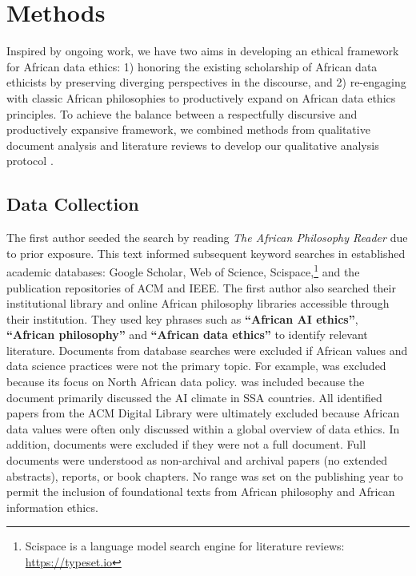 \section{Methods}
\label{sec:methods}
Inspired by ongoing work,
we have two aims in
developing an ethical framework for African data ethics: 1) honoring the existing scholarship of African data ethicists by preserving diverging perspectives in the discourse, and 2) re-engaging with classic African philosophies to productively expand on African data ethics principles. To achieve the balance between a respectfully discursive and productively expansive framework, we combined methods from qualitative document analysis and literature reviews to develop our qualitative analysis protocol
\cite{morgan2022conducting, birhane2022forgotten, battle2024what}. 

\subsection{Data Collection}
The first author seeded the search by reading \textit{The African Philosophy Reader} \cite{coetzee2004african} due to prior exposure.
This text informed subsequent keyword searches in established academic databases:
Google Scholar, Web of Science, Scispace,\footnote{
Scispace is a language model search engine for literature reviews: \url{https://typeset.io}} and the publication repositories of ACM and IEEE.
The first author also searched their institutional library and online African philosophy libraries accessible through their institution.
They used key phrases such as \textbf{``African AI ethics''}, \textbf{``African philosophy''} and \textbf{``African data ethics''} to identify relevant literature. 
Documents from database searches were excluded if African values and data science practices were not the primary topic. For example, \citet{stahl2023ai} 
was excluded because its focus on North African data policy. \citet{okolo2023responsible} was included because the document primarily discussed the AI climate in SSA countries. All identified papers from the ACM Digital Library were ultimately excluded because African data values were often only discussed within a global overview of data ethics. 
In addition, documents were excluded if they were not a full document. Full documents were understood as non-archival and archival papers (no extended abstracts), reports, or book chapters. No range was set on the publishing year to permit the inclusion of foundational texts from African philosophy and African information ethics.

